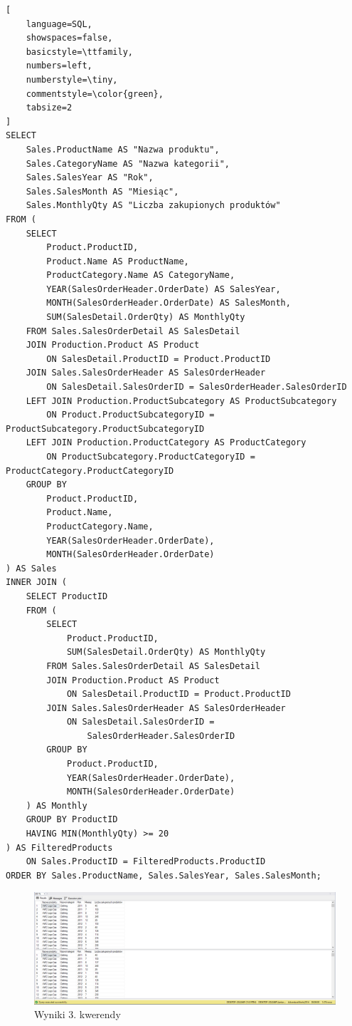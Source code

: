 \documentclass[a4paper,12pt]{article}
\begin{document}
{\small
\begin{lstlisting}[
	language=SQL,
	showspaces=false,
	basicstyle=\ttfamily,
	numbers=left,
	numberstyle=\tiny,
	commentstyle=\color{green},
	tabsize=2
]
SELECT 
	Sales.ProductName AS "Nazwa produktu",
	Sales.CategoryName AS "Nazwa kategorii",
	Sales.SalesYear AS "Rok",
	Sales.SalesMonth AS "Miesiąc",
	Sales.MonthlyQty AS "Liczba zakupionych produktów"
FROM (
	SELECT 
		Product.ProductID,
		Product.Name AS ProductName,
		ProductCategory.Name AS CategoryName,
		YEAR(SalesOrderHeader.OrderDate) AS SalesYear,
		MONTH(SalesOrderHeader.OrderDate) AS SalesMonth,
		SUM(SalesDetail.OrderQty) AS MonthlyQty
	FROM Sales.SalesOrderDetail AS SalesDetail
	JOIN Production.Product AS Product 
		ON SalesDetail.ProductID = Product.ProductID
	JOIN Sales.SalesOrderHeader AS SalesOrderHeader
		ON SalesDetail.SalesOrderID = SalesOrderHeader.SalesOrderID
	LEFT JOIN Production.ProductSubcategory AS ProductSubcategory
		ON Product.ProductSubcategoryID = ProductSubcategory.ProductSubcategoryID
	LEFT JOIN Production.ProductCategory AS ProductCategory
		ON ProductSubcategory.ProductCategoryID = ProductCategory.ProductCategoryID
	GROUP BY 
		Product.ProductID, 
		Product.Name,
		ProductCategory.Name,
		YEAR(SalesOrderHeader.OrderDate), 
		MONTH(SalesOrderHeader.OrderDate)
) AS Sales
INNER JOIN (
	SELECT ProductID
	FROM (
		SELECT 
			Product.ProductID,
			SUM(SalesDetail.OrderQty) AS MonthlyQty
		FROM Sales.SalesOrderDetail AS SalesDetail
		JOIN Production.Product AS Product 
			ON SalesDetail.ProductID = Product.ProductID
		JOIN Sales.SalesOrderHeader AS SalesOrderHeader
			ON SalesDetail.SalesOrderID = 
				SalesOrderHeader.SalesOrderID
		GROUP BY 
			Product.ProductID,
			YEAR(SalesOrderHeader.OrderDate), 
			MONTH(SalesOrderHeader.OrderDate)
	) AS Monthly
	GROUP BY ProductID
	HAVING MIN(MonthlyQty) >= 20
) AS FilteredProducts
    ON Sales.ProductID = FilteredProducts.ProductID
ORDER BY Sales.ProductName, Sales.SalesYear, Sales.SalesMonth;
\end{lstlisting}}

\begin{figure}[H]
	\centering
	\includegraphics[width=1.0\textwidth]{images/3.png}
	\caption{Wyniki 3. kwerendy}
\end{figure}
\end{document}

